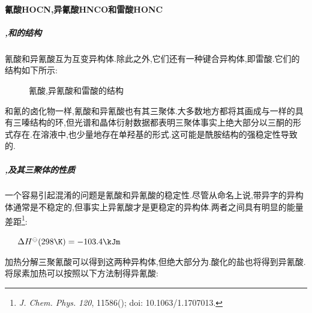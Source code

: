 \documentclass{ctexart}
\begin{document}
\paragraph{氰酸HOCN,异氰酸HNCO和雷酸HONC}
\subparagraph{,和的结构}
氰酸和异氰酸互为互变异构体.除此之外,它们还有一种键合异构体,即雷酸.它们的结构如下所示:
\begin{figure}[H]
    \centering
    \caption{氰酸,异氰酸和雷酸的结构}
\end{figure}
和氰的卤化物一样,氰酸和异氰酸也有其三聚体.大多数地方都将其画成与一样的具有三嗪结构的环,但光谱和晶体衍射数据都表明三聚体事实上绝大部分以三酮的形式存在.在溶液中,也少量地存在单羟基的形式.这可能是酰胺结构的强稳定性导致的.
\subparagraph{,及其三聚体的性质}
一个容易引起混淆的问题是氰酸和异氰酸的稳定性.尽管从命名上说,带异字的异构体通常是不稳定的,但事实上异氰酸才是更稳定的异构体.两者之间具有明显的能量差距\footnote{\textit{J. Chem. Phys.}  \textit{120}, 11586(); doi: 10.1063/1.1707013.}:
\begin{center}
    \ \ \ $\Delta H^{\ominus}(298\K)=-103.4\kJm$
\end{center}

\indent 加热分解三聚氰酸可以得到这两种异构体,但绝大部分为.酸化的盐也将得到异氰酸.将尿素加热可以按照以下方法制得异氰酸:
\begin{center}
\end{center}
\end{document}
